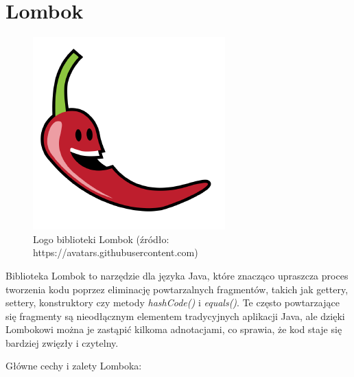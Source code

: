 \section{Lombok}
\begin{figure}[h]
    \centering
    \includegraphics[width=0.4\linewidth]{./img/lombok.png}
    \caption{Logo biblioteki Lombok (źródło: https://avatars.githubusercontent.com)}
    \label{fig:Lombok}
\end{figure}
Biblioteka Lombok to narzędzie dla języka Java, które znacząco upraszcza proces tworzenia kodu poprzez eliminację powtarzalnych fragmentów, takich jak gettery, settery, konstruktory czy metody \textit{hashCode()} i \textit{equals()}. Te często powtarzające się fragmenty są nieodłącznym elementem tradycyjnych aplikacji Java, ale dzięki Lombokowi można je zastąpić kilkoma adnotacjami, co sprawia, że kod staje się bardziej zwięzły i czytelny.

Główne cechy i zalety Lomboka:

